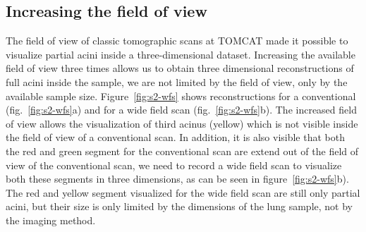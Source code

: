 \subsection{Increasing the field of view}
The field of view of classic tomographic scans at TOMCAT made it possible to visualize partial acini inside a three-dimensional dataset. Increasing the available field of view three times allows us to obtain three dimensional reconstructions of full acini inside the sample, we are not limited by the field of view, only by the available sample size. Figure~\ref{fig:s2-wfs} shows reconstructions for a conventional (fig.~\ref{fig:s2-wfs}a) and for a wide field scan (fig.~\ref{fig:s2-wfs}b). The increased field of view allows the visualization of third acinus (yellow) which is not visible inside the field of view of a conventional scan. In addition, it is also visible that both the red and green segment for the conventional scan are extend out of the field of view of the conventional scan, we need to record a wide field scan to visualize both these segments in three dimensions, as can be seen in figure~\ref{fig:s2-wfs}b). The red and yellow segment visualized for the wide field scan are still only partial acini, but their size is only limited by the dimensions of the lung sample, not by the imaging method.

